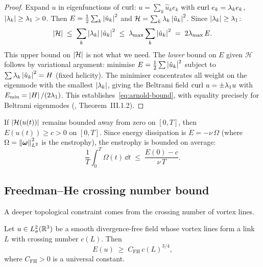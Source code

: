 \begin{proof}
  Expand $u$ in eigenfunctions of $\operatorname{curl}$: $u = \sum_k \hat{u}_k e_k$ with
  $\operatorname{curl}\,e_k = \lambda_k e_k$, $\left\lvert \lambda_k \right\rvert \geq \lambda_1 > 0$.
  Then $E = \frac{1}{2}\sum_k\left\lvert \hat{u}_k \right\rvert^2$ and
  $\mathcal{H} = \sum_k\lambda_k\left\lvert \hat{u}_k \right\rvert^2$.
  Since $\left\lvert \lambda_k \right\rvert \geq \lambda_1$:
  \[
    \left\lvert \mathcal{H} \right\rvert
    \;\leq\; \sum_k \left\lvert \lambda_k \right\rvert\left\lvert \hat{u}_k \right\rvert^2
    \;\leq\; \lambda_{\max}\sum_k\left\lvert \hat{u}_k \right\rvert^2
    \;=\; 2\lambda_{\max}\,E.
  \]
  This upper bound on $\left\lvert \mathcal{H} \right\rvert$ is not what we need.  The
  \emph{lower} bound on $E$ given $\mathcal{H}$ follows by variational
  argument: minimise $E = \frac{1}{2}\sum\left\lvert \hat{u}_k \right\rvert^2$ subject to
  $\sum\lambda_k\left\lvert \hat{u}_k \right\rvert^2 = H$ (fixed helicity).
  The minimiser concentrates all weight on the eigenmode with the smallest
  $\left\lvert \lambda_k \right\rvert$, giving the Beltrami field $\operatorname{curl}\,u = \pm\lambda_1 u$
  with $E_{\min} = \left\lvert H \right\rvert/(2\lambda_1)$.  This establishes~\eqref{eq:arnold-bound},
  with equality precisely for Beltrami eigenmodes
  (\cite{arnoldKhesin1998}, Theorem~III.1.2).
\end{proof}

\begin{corollary}\label{cor:helicity-enstrophy}
  If $\left\lvert \mathcal{H}(u(t)) \right\rvert$ remains bounded away from zero on $[0,T]$, then
  $E(u(t)) \geq c > 0$ on $[0,T]$.  Since energy dissipation is
  $\dot{E} = -\nu\,\Omega$ (where $\Omega = \left\lVert \boldsymbol{\omega} \right\rVert_{L^{2}}^2$ is the enstrophy),
  the enstrophy is bounded on average:
  \begin{equation}\label{eq:avg-enstrophy-bound}
    \frac{1}{T}\int_0^T \Omega(t)\,\dd t
    \;\leq\; \frac{E(0) - c}{\nu\,T}.
  \end{equation}
\end{corollary}

\subsection{Freedman--He crossing number bound}\label{sec:det-freedman-he}

A deeper topological constraint comes from the crossing number of vortex lines.

\begin{theorem}\label{thm:freedman-he}
  Let $u \in L^{2}_\sigma(\mathbb{R}^3)$ be a smooth divergence-free field whose vortex lines
  form a link $L$ with crossing number $c(L)$.  Then
  \begin{equation}\label{eq:freedman-he}
    E(u) \;\geq\; C_{\mathrm{FH}}\,c(L)^{3/4},
  \end{equation}
  where $C_{\mathrm{FH}} > 0$ is a universal constant.
\end{theorem}

